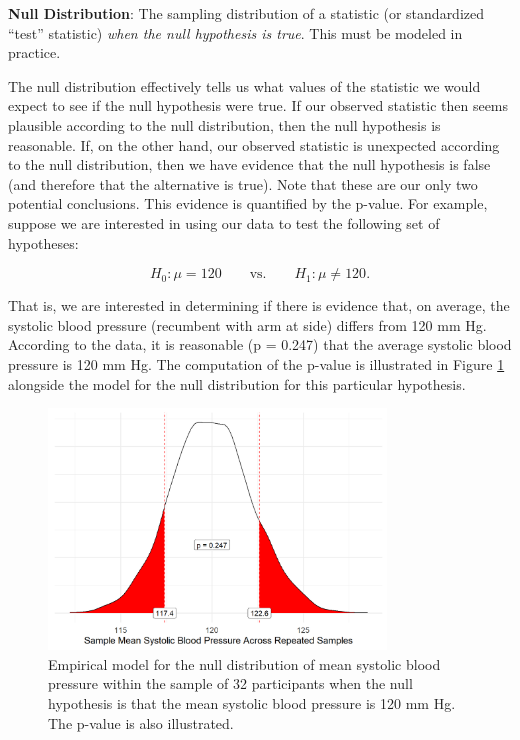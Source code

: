 \documentclass[
]{book}
\theoremstyle{plain}
\theoremstyle{mydefn}
\theoremstyle{myexmpl}
\theoremstyle{remark}
\begin{document}
\begin{rmdfivefund}
\textbf{Null Distribution}: The sampling distribution of a statistic (or standardized ``test'' statistic) \emph{when the null hypothesis is true}. This must be modeled in practice.
\end{rmdfivefund}

The null distribution effectively tells us what values of the statistic we would expect to see if the null hypothesis were true. If our observed statistic then seems plausible according to the null distribution, then the null hypothesis is reasonable. If, on the other hand, our observed statistic is unexpected according to the null distribution, then we have evidence that the null hypothesis is false (and therefore that the alternative is true). Note that these are our only two potential conclusions. This evidence is quantified by the p-value. For example, suppose we are interested in using our data to test the following set of hypotheses:

\[H_0: \mu = 120 \qquad \text{vs.} \qquad H_1: \mu \neq 120.\]

That is, we are interested in determining if there is evidence that, on average, the systolic blood pressure (recumbent with arm at side) differs from 120 mm Hg. According to the data, it is reasonable (p = 0.247) that the average systolic blood pressure is 120 mm Hg. The computation of the p-value is illustrated in Figure \ref{fig:distributional-quartet-null-distribution} alongside the model for the null distribution for this particular hypothesis.

\begin{figure}

{\centering \includegraphics[width=0.8\textwidth]{./Images/distributional-quartet-null-distribution-1} 

}

\caption{Empirical model for the null distribution of mean systolic blood pressure within the sample of 32 participants when the null hypothesis is that the mean systolic blood pressure is 120 mm Hg. The p-value is also illustrated.}\label{fig:distributional-quartet-null-distribution}
\end{figure}
\end{document}
